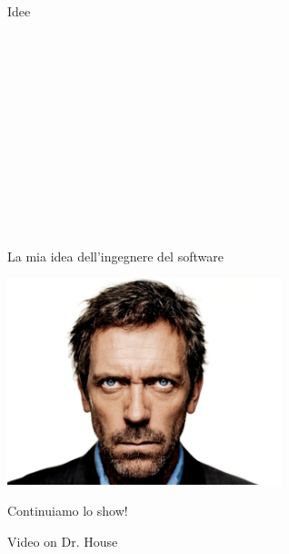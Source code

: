 \documentclass{beamer}
\begin{document}
\begin{frame}{\centerline{Idee}}
\noindent\makebox[\linewidth]{\rule{\paperwidth}{0.4pt}}\\
\vspace{0.5cm}

\noindent\makebox[\linewidth]{\rule{\paperwidth}{0.4pt}}\\
\vspace{0.5cm}

\noindent\makebox[\linewidth]{\rule{\paperwidth}{0.4pt}}\\
\vspace{0.5cm}

\noindent\makebox[\linewidth]{\rule{\paperwidth}{0.4pt}}\\
\vspace{0.5cm}

\noindent\makebox[\linewidth]{\rule{\paperwidth}{0.4pt}}\\
\vspace{0.5cm}

\noindent\makebox[\linewidth]{\rule{\paperwidth}{0.4pt}}\\
\vspace{0.5cm}

\noindent\makebox[\linewidth]{\rule{\paperwidth}{0.4pt}}\\

\end{frame}

\begin{frame}{\centerline{La mia idea dell'ingegnere del software}}

\begin{center}
\includegraphics[width=80mm]{A2022.IDSEPC.ProcessoDiProduzione/DrHouse_SoftwareEngineer.jpg}
\end{center}

\end{frame}

\begin{frame}{\centerline{Continuiamo lo show!}}
\vspace*{1.5cm}
\begin{center}
\Huge Video on Dr. House

\end{center}

\end{frame}
\end{document}
